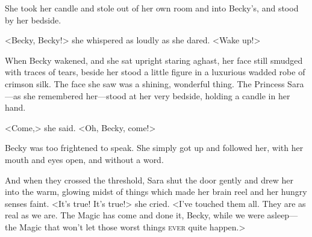 She took her candle and stole out of her own room and into Becky's, and stood by her bedside.

<Becky, Becky!> she whispered as loudly as she dared. <Wake up!>

When Becky wakened, and she sat upright staring aghast, her face still smudged with traces of tears, beside her stood a little figure in a luxurious wadded robe of crimson silk. The face she saw was a shining, wonderful thing. The Princess Sara—as she remembered her—stood at her very bedside, holding a candle in her hand.

<Come,> she said. <Oh, Becky, come!>

Becky was too frightened to speak. She simply got up and followed her, with her mouth and eyes open, and without a word.

And when they crossed the threshold, Sara shut the door gently and drew her into the warm, glowing midst of things which made her brain reel and her hungry senses faint. <It's true! It's true!> she cried. <I've touched them all. They are as real as we are. The Magic has come and done it, Becky, while we were asleep—the Magic that won't let those worst things \textsc{ever} quite happen.>